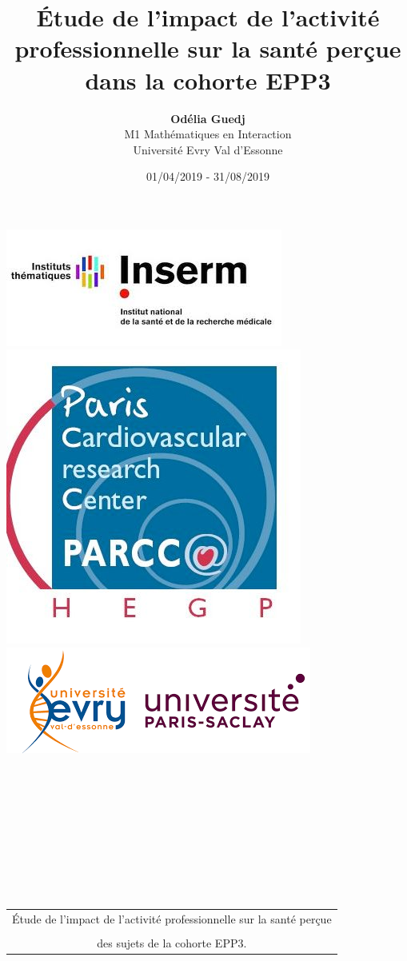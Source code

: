\documentclass{book}
\author{\textbf{Odélia Guedj} \\ M1 Mathématiques en Interaction \\ Université Evry Val d'Essonne}
\title{\LARGE{Étude de l'impact de l'activité professionnelle sur la santé perçue dans la cohorte EPP3}}
\date{01/04/2019 - 31/08/2019}
\begin{document}
\begin{titlepage}

\enlargethispage{10 cm}

\includegraphics[scale = .4]{logo_inserm.jpg}\hfill
\includegraphics[scale = .2]{logo_parcc.jpg}\hfill
\includegraphics[scale = .4]{logo_ueve_saclay.png}
\\ \\ \\ \\ \\ \\ \\ \\ \\ \\

\begin{center}
\begin{tabular}{c}
\hline
\hline
\LARGE{Étude de l'impact de l'activité professionnelle sur la santé perçue} \\
\\
\LARGE{des sujets de la cohorte EPP3}. \\
\hline
\hline
\end{tabular}
\end{center}


\end{titlepage}
\end{document}
